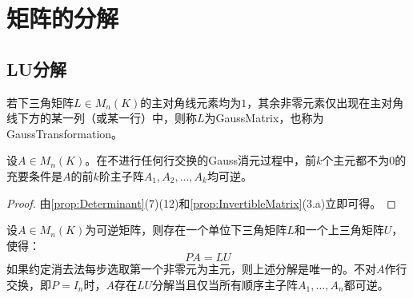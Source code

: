 \section{矩阵的分解}

\subsection{LU分解}
\begin{definition}
	若下三角矩阵$L\in M_{n}(K)$的主对角线元素均为$1$，其余非零元素仅出现在主对角线下方的某一列（或某一行）中，则称$L$为\gls{GaussMatrix}，也称为\gls{GaussTransformation}。
\end{definition}
\begin{lemma}\label{lem:LU}
	设$A\in M_n(K)$。在不进行任何行交换的Gauss消元过程中，前$k$个主元都不为$0$的充要条件是$A$的前$k$阶主子阵$A_1,A_2,\dots,A_k$均可逆。
\end{lemma}
\begin{proof}
	由\cref{prop:Determinant}(7)(12)和\cref{prop:InvertibleMatrix}(3.a)立即可得。
\end{proof}
\begin{theorem}\label{theo:LU}
	设$A\in M_{n}(K)$为可逆矩阵，则存在一个单位下三角矩阵$L$和一个上三角矩阵$U$，使得：
	\begin{equation*}
		PA = LU
	\end{equation*}
	如果约定消去法每步选取第一个非零元为主元，则上述分解是唯一的。不对$A$作行交换，即$P=I_n$时，$A$存在$LU$分解当且仅当所有顺序主子阵$A_1,\dots,A_n$都可逆。
\end{theorem}
